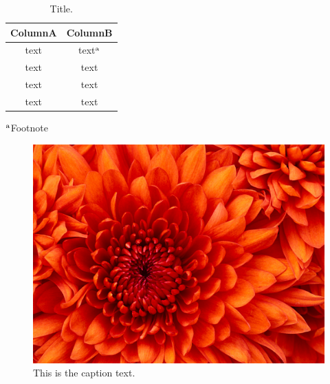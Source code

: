 \documentclass[12pt, twoside]{article}
\begin{document}


\begin{table}[H]
	\centering
	\caption{Title.}
	\small
	\begin{tabular}{cc}
		\hline
		ColumnA & ColumnB \\ \hline
		text & text{\scriptsize $^{\rm a}$} \\
		text & text \\
		text & text \\
		text & text \\
		\hline
	\end{tabular}
	
	{\footnotesize 	{\scriptsize $^{\rm a}$}Footnote}
\end{table}
\begin{figure}[h] 
	\centering 	\includegraphics[width=0.5\linewidth]{Chrysanthemum.jpg}
	\caption{This is the caption text.}
	\label{fig:Chrysanthemum}
\end{figure}
\end{document}

